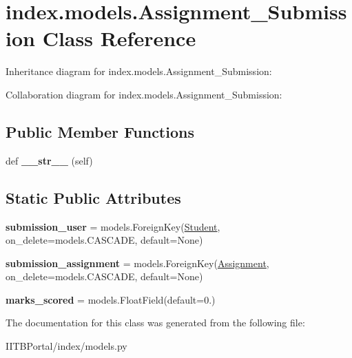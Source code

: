 \hypertarget{classindex_1_1models_1_1Assignment__Submission}{}\section{index.\+models.\+Assignment\+\_\+\+Submission Class Reference}
\label{classindex_1_1models_1_1Assignment__Submission}


Inheritance diagram for index.\+models.\+Assignment\+\_\+\+Submission\+:


Collaboration diagram for index.\+models.\+Assignment\+\_\+\+Submission\+:
\subsection*{Public Member Functions}
\begin{DoxyCompactItemize}
\item 
\mbox{\label{classindex_1_1models_1_1Assignment__Submission_ad039d4a3d16c12335c7ead940d450d9c}} 
def {\bfseries \+\_\+\+\_\+str\+\_\+\+\_\+} (self)
\end{DoxyCompactItemize}
\subsection*{Static Public Attributes}
\begin{DoxyCompactItemize}
\item 
\mbox{\label{classindex_1_1models_1_1Assignment__Submission_ae8e402a79d626ce497b4e242ce3218a2}} 
{\bfseries submission\+\_\+user} = models.\+Foreign\+Key(\hyperlink{classindex_1_1models_1_1Student}{Student}, on\+\_\+delete=models.\+C\+A\+S\+C\+A\+DE, default=None)
\item 
\mbox{\label{classindex_1_1models_1_1Assignment__Submission_a302cb790dfd863b627ddcbde10c46135}} 
{\bfseries submission\+\_\+assignment} = models.\+Foreign\+Key(\hyperlink{classindex_1_1models_1_1Assignment}{Assignment}, on\+\_\+delete=models.\+C\+A\+S\+C\+A\+DE, default=None)
\item 
\mbox{\label{classindex_1_1models_1_1Assignment__Submission_a7656def043efb19cf88d671980b6be57}} 
{\bfseries marks\+\_\+scored} = models.\+Float\+Field(default=0.)
\end{DoxyCompactItemize}


The documentation for this class was generated from the following file\+:\begin{DoxyCompactItemize}
\item 
I\+I\+T\+B\+Portal/index/models.\+py\end{DoxyCompactItemize}
